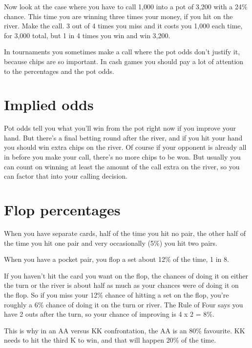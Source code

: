 
Now look at the case where you have to call 1,000
into a pot of 3,200 with a 24\% chance. This time you are winning
three times your money, if you hit on the river. Make the call. 3 out
of 4 times you miss and it costs you 1,000 each time, for 3,000 total,
but 1 in 4 times you win and win 3,200.


In tournaments you sometimes make a call where the pot odds don't
justify it, because chips are so important. In cash games you should
pay a lot of attention to the percentages and the pot odds.

\section{Implied odds}

Pot odds tell you what you'll win from the pot right now if you
improve your hand. But there's a final betting round after the river,
and if you hit your hand you should win extra chips on the river. Of
course if your opponent is already all in before you make your call,
there's no more chips to be won. But usually you can count on winning
at least the amount of the call extra on the river, so you can factor
that into your calling decision.

\section{Flop percentages}

When you have separate cards, half of the time you hit no pair, the
other half of the time you hit one pair and very occasionally (5\%)
you hit two pairs.

When you have a pocket pair, you flop a set about 12\% of the time, 1
in 8.

If you haven't hit the card you want on the flop, the chances of doing
it on either the turn or the river is about half as much as your
chances were of doing it on the flop. So if you miss your 12\% chance
of hitting a set on the flop, you're roughly a 6\% chance of doing it
on the turn or river. The Rule of Four says you have 2 outs after the
turn, so your chance of improving is 4 x 2 = 8\%.

This is why in an AA versus KK confrontation, the AA is an 80\%
favourite. KK needs to hit the third K to win, and that will happen
20\% of the time.

